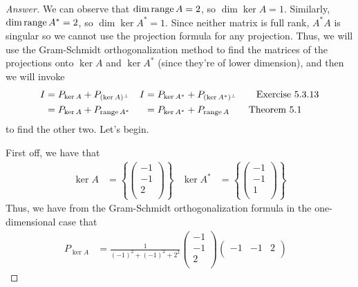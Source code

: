 \documentclass[../psets.tex]{subfiles}
\begin{document}
\begin{enumerate}[label={\textbf{5.\arabic*.}}]
\begin{proof}[Answer]
        We can observe that $\dim\operatorname{range} A=2$, so $\dim\ker A=1$. Similarly, $\dim\operatorname{range} A^*=2$, so $\dim\ker A^*=1$. Since neither matrix is full rank, $A^*A$ is singular so we cannot use the projection formula for any projection. Thus, we will use the Gram-Schmidt orthogonalization method to find the matrices of the projections onto $\ker A$ and $\ker A^*$ (since they're of lower dimension), and then we will invoke
        \begin{align*}
            I &= P_{\ker A}+P_{(\ker A)^\perp}&
                I &= P_{\ker A^*}+P_{(\ker A^*)^\perp}\tag*{Exercise 5.3.13}\\
            &= P_{\ker A}+P_{\operatorname{range} A^*}&
                &= P_{\ker A^*}+P_{\operatorname{range} A}\tag*{Theorem 5.1}
        \end{align*}
        to find the other two. Let's begin.\par
        First off, we have that
        \begin{align*}
            \ker A &= \left\{
                \begin{pmatrix}
                    -1\\
                    -1\\
                    2\\
                \end{pmatrix}
            \right\}&
                \ker A^* &= \left\{
                    \begin{pmatrix}
                        -1\\
                        -1\\
                        1\\
                    \end{pmatrix}
                \right\}
        \end{align*}
        Thus, we have from the Gram-Schmidt orthogonalization formula in the one-dimensional case that
        \begin{align*}
            P_{\ker A} &= \frac{1}{(-1)^2+(-1)^2+2^2}
            \begin{pmatrix}
                -1\\
                -1\\
                2\\
            \end{pmatrix}
            \begin{pmatrix}
                -1 & -1 & 2\\
            \end{pmatrix}&

\end{align*}
\end{proof}
\end{enumerate}
\end{document}
